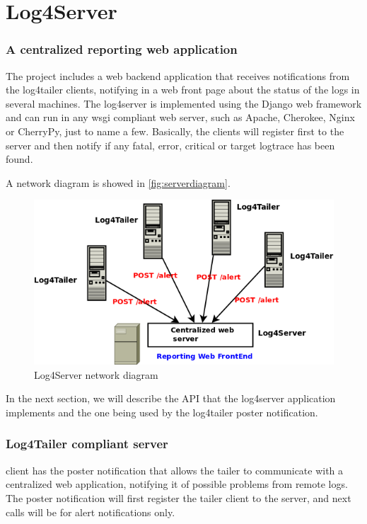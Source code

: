 \part{Log4Server}

\section{A centralized reporting web application}
\label{sec:log4server}
The \logftailer{} project includes a web backend application that receives
notifications from the log4tailer clients, notifying in a web front page about
the status of the logs in several machines. The log4server is implemented using
the Django web framework and can run in any wsgi compliant web server, such as
Apache, Cherokee, Nginx or CherryPy, just to name a few. Basically, the clients
will register first to the server and then notify if any fatal, error, critical
or target logtrace has been found. 

A network diagram is showed in \autoref{fig:serverdiagram}.

\begin{figure}[hb]
\centering
\includegraphics[scale=0.50]{serverdiagram.png}
\caption{Log4Server network diagram}\label{fig:serverdiagram}
\end{figure}


In the next section, we will describe the API that the log4server application
implements and the one being used by the log4tailer poster notification.

\section{Log4Tailer compliant server}
\logftailer{} client has the poster notification that allows the tailer to
communicate with a centralized web application, notifying it of possible
problems from remote logs.  The poster notification will first register the
tailer client to the server, and next calls will be for alert notifications
only.

